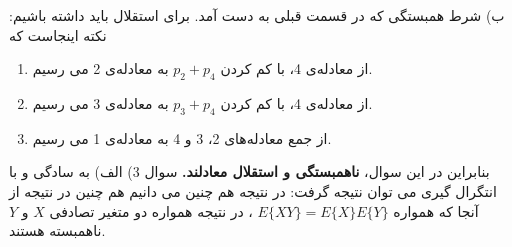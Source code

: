 \documentclass[10pt,letterpaper]{article}
\begin{document}
ب) شرط همبستگی که در قسمت قبلی به دست آمد. برای استقلال باید داشته باشیم:
نکته اینجاست که
\begin{enumerate}
\item
از معادله‌ی 4، با کم کردن 
$
p_2+p_4
$
 به معادله‌ی 2 می رسیم.
\item
از معادله‌ی 4، با کم کردن 
$
p_3+p_4
$
 به معادله‌ی 3 می رسیم.
\item
از جمع معادله‌های 2، 3 و 4 به معادله‌ی 1 می رسیم.
\end{enumerate}
بنابراین در این سوال، 
\textbf{
ناهمبستگی و استقلال معادلند.
}
\newline\newline
سوال 3) الف) به سادگی و با انتگرال گیری می توان نتیجه گرفت:
در نتیجه
هم چنین می دانیم
هم چنین
در نتیجه
از آنجا که همواره 
$
E\{XY\}=E\{X\}E\{Y\}
$
، در نتیجه همواره دو متغیر تصادفی $X$ و $Y$ ناهمبسته هستند.
\end{document}
